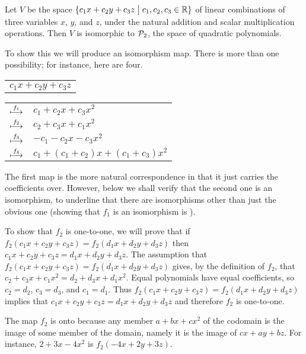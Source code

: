 \begin{example} \label{ex:LinComboThreeIsoPTwo}
Let \( V \) be the space 
\( \mbox{$\{c_1x+c_2y+c_3z\bigm| c_1,c_2,c_3\in\mathbb{R}\}$} \)
of linear combinations of three variables $x$, $y$, and $z$, 
under the natural addition and scalar multiplication operations. 
Then $V$ is isomorphic to $\mathcal{P}_2$, the space of quadratic 
polynomials.

To show this we will produce an isomorphism map.
There is more than one possibility; for instance, here are four.
\begin{center}
  \begin{tabular}{c}
    $c_1x+c_2y+c_3z$
  \end{tabular}  \quad
  \begin{tabular}{rl}
      $\stackrel{f_1}{\longmapsto}$    &$c_1+c_2x+c_3x^2$  \\
      $\stackrel{f_2}{\longmapsto}$    &$c_2+c_3x+c_1x^2$  \\
      $\stackrel{f_3}{\longmapsto}$    &$-c_1-c_2x-c_3x^2$  \\
      $\stackrel{f_4}{\longmapsto}$    &$c_1+(c_1+c_2)x+(c_1+c_3)x^2$
  \end{tabular}
\end{center}
The first map is the more natural correspondence
in that it just carries the coefficients over. 
However, below
we shall verify that the second one is an isomorphism,
to underline that there are isomorphisms
other than just the obvious one 
(showing that $f_1$ is an isomorphism is 
).

To show that $f_2$ is one-to-one, we will prove that if
$f_2(c_1x+c_2y+c_3z)=f_2(d_1x+d_2y+d_3z)$
then $c_1x+c_2y+c_3z=d_1x+d_2y+d_3z$.
The assumption that $f_2(c_1x+c_2y+c_3z)=f_2(d_1x+d_2y+d_3z)$
gives, by the definition of $f_2$, 
that $c_2+c_3x+c_1x^2=d_2+d_3x+d_1x^2$.
Equal polynomials have equal coefficients, so 
$c_2=d_2$, $c_3=d_3$, and $c_1=d_1$.
Thus $f_2(c_1x+c_2y+c_3z)=f_2(d_1x+d_2y+d_3z)$ implies that
$c_1x+c_2y+c_3z=d_1x+d_2y+d_3z$ and therefore $f_2$ is one-to-one.

The map $f_2$ is onto because any member $a+bx+cx^2$ of the codomain 
is the image of some member of the domain,
namely it is the image of $cx+ay+bz$.
For instance, $2+3x-4x^2$ is $f_2(-4x+2y+3z)$.


\end{example}
